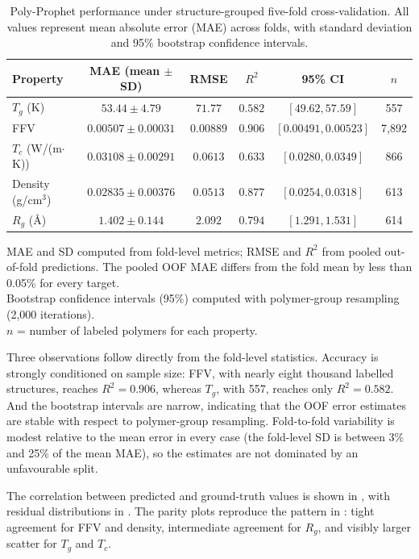 \documentclass{article}
\begin{document}
\begin{table}[H]
\centering
\caption{Poly-Prophet performance under structure-grouped five-fold cross-validation. All values represent mean absolute error (MAE) across folds, with standard deviation and 95\% bootstrap confidence intervals.}
\label{tab:model_performance}
\begin{tabular}{lccccc}
\toprule
\textbf{Property} & \textbf{MAE (mean $\pm$ SD)} & \textbf{RMSE} & \textbf{$R^2$} & \textbf{95\% CI} & \textbf{$n$} \\
\midrule
$T_g$ (K) & $53.44 \pm 4.79$ & $71.77$ & $0.582$ & $[49.62, 57.59]$ & 557 \\
FFV & $0.00507 \pm 0.00031$ & $0.00889$ & $0.906$ & $[0.00491, 0.00523]$ & 7,892 \\
$T_c$ (W/(m$\cdot$K)) & $0.03108 \pm 0.00291$ & $0.0613$ & $0.633$ & $[0.0280, 0.0349]$ & 866 \\
Density (g/cm$^3$) & $0.02835 \pm 0.00376$ & $0.0513$ & $0.877$ & $[0.0254, 0.0318]$ & 613 \\
$R_g$ (\AA) & $1.402 \pm 0.144$ & $2.092$ & $0.794$ & $[1.291, 1.531]$ & 614 \\
\bottomrule
\end{tabular}

\vspace{0.5em}
\footnotesize
MAE and SD computed from fold-level metrics; RMSE and $R^2$ from pooled out-of-fold predictions. The pooled OOF MAE differs from the fold mean by less than 0.05\% for every target. \\
Bootstrap confidence intervals (95\%) computed with polymer-group resampling (2,000 iterations). \\
$n$ = number of labeled polymers for each property.
\end{table}

Three observations follow directly from the fold-level statistics. Accuracy is strongly conditioned on sample size: FFV, with nearly eight thousand labelled structures, reaches $R^2 = 0.906$, whereas $T_g$, with 557, reaches only $R^2 = 0.582$. And the bootstrap intervals are narrow, indicating that the OOF error estimates are stable with respect to polymer-group resampling. Fold-to-fold variability is modest relative to the mean error in every case (the fold-level SD is between 3\% and 25\% of the mean MAE), so the estimates are not dominated by an unfavourable split.

The correlation between predicted and ground-truth values is shown in , with residual distributions in . The parity plots reproduce the pattern in : tight agreement for FFV and density, intermediate agreement for $R_g$, and visibly larger scatter for $T_g$ and $T_c$.
\end{document}
